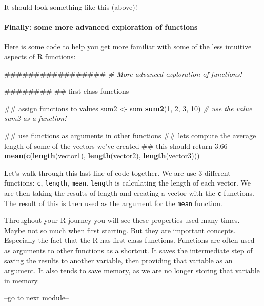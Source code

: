 \documentclass[]{article}
\newenvironment{Shaded}{\begin{snugshade}}{\end{snugshade}}
\newcommand{\KeywordTok}[1]{\textcolor[rgb]{0.13,0.29,0.53}{\textbf{#1}}}
\newcommand{\DecValTok}[1]{\textcolor[rgb]{0.00,0.00,0.81}{#1}}
\newcommand{\StringTok}[1]{\textcolor[rgb]{0.31,0.60,0.02}{#1}}
\newcommand{\CommentTok}[1]{\textcolor[rgb]{0.56,0.35,0.01}{\textit{#1}}}
\newcommand{\NormalTok}[1]{#1}
\let\oldparagraph\paragraph
\renewcommand{\paragraph}[1]{\oldparagraph{#1}\mbox{}}
\begin{document}
It should look something like this (above)!

\paragraph{Finally: some more advanced exploration of
functions}\label{finally-some-more-advanced-exploration-of-functions}

Here is some code to help you get more familiar with some of the less
intuitive aspects of R functions:

\begin{Shaded}
\begin{Highlighting}[]
\NormalTok{#################}
\CommentTok{# More advanced exploration of functions!}

\NormalTok{########}
\NormalTok{## first class functions}

\NormalTok{## assign functions to values}
\NormalTok{sum2 <-}\StringTok{ }\NormalTok{sum}
\KeywordTok{sum2}\NormalTok{(}\DecValTok{1}\NormalTok{, }\DecValTok{2}\NormalTok{, }\DecValTok{3}\NormalTok{, }\DecValTok{10}\NormalTok{)    }\CommentTok{# use the value sum2 as a function!}

\NormalTok{## use functions as arguments in other functions}
\NormalTok{## lets compute the average length of some of the vectors we've created}
\NormalTok{## this should return 3.66}
\KeywordTok{mean}\NormalTok{(}\KeywordTok{c}\NormalTok{(}\KeywordTok{length}\NormalTok{(vector1), }\KeywordTok{length}\NormalTok{(vector2), }\KeywordTok{length}\NormalTok{(vector3)))}
\end{Highlighting}
\end{Shaded}

Let's walk through this last line of code together. We are use 3
different functions: \texttt{c}, \texttt{length}, \texttt{mean}.
\texttt{length} is calculating the length of each vector. We are then
taking the results of length and creating a vector with the \texttt{c}
functions. The result of this is then used as the argument for the
\texttt{mean} function.

Throughout your R journey you will see these properties used many times.
Maybe not so much when first starting. But they are important concepts.
Especially the fact that the R has first-class functions. Functions are
often used as arguments to other functions as a shortcut. It saves the
intermediate step of saving the results to another variable, then
providing that variable as an argument. It also tends to save memory, as
we are no longer storing that variable in memory.

\href{module1_2.html}{--go to next module--}
\end{document}
